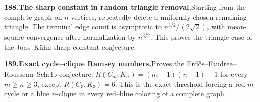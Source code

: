 \documentclass[11pt,a4paper]{article}
\begin{document}
  \par \begin{minipage}{\linewidth}
  \fontsize{10.5}{12.6}\selectfont\RaggedRight
  \hypertarget{result 188}{}
  {\bfseries\textcolor{muted}{188.}\enspace The sharp constant in random triangle removal.}\enspace Starting from the complete graph on $n$ vertices, repeatedly delete a uniformly chosen remaining triangle. The terminal edge count is asymptotic to $n^{3/2}/(2\sqrt2)$, with mean-square convergence after normalization by $n^{3/2}$. This proves the triangle case of the Joos--K\"uhn sharp-constant conjecture.\par
  \end{minipage}\par\vspace{5pt}



  \par \begin{minipage}{\linewidth}
  \fontsize{10.5}{12.6}\selectfont\RaggedRight
  \hypertarget{result 189}{}
  {\bfseries\textcolor{muted}{189.}\enspace Exact cycle--clique Ramsey numbers.}\enspace Proves the Erd\H{o}s--Faudree--Rousseau--Schelp conjecture: $R(C_m,K_n)=(m-1)(n-1)+1$ for every $m\ge n\ge3$, except $R(C_3,K_3)=6$. This is the exact threshold forcing a red $m$-cycle or a blue $n$-clique in every red--blue coloring of a complete graph.\par
  \end{minipage}\par\vspace{5pt}
\end{document}
